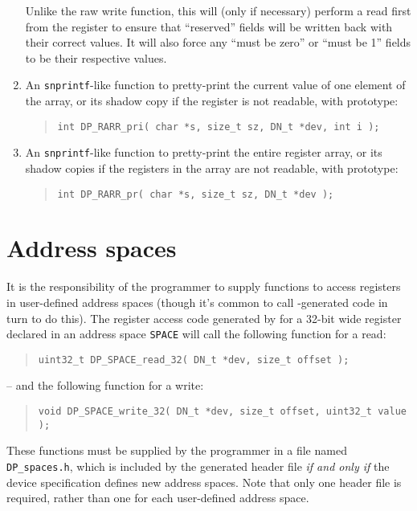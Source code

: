 \documentclass[a4paper,11pt,twoside]{report}
\begin{document}
\begin{enumerate}
  Unlike the raw write function, this will (only if necessary) perform
  a read first from the register to ensure that ``reserved'' fields
  will be written back with their correct values.  It will also force
  any ``must be zero'' or ``must be 1'' fields to be their respective 
  values.  
  
\item An \texttt{snprintf}-like function to pretty-print the
  current value of one element of the array, or its shadow copy if the
  register is not readable, with prototype:
  \begin{quote}
    \texttt{int DP\_RARR\_pri( char *s, size\_t sz, DN\_t *dev, int i );}
  \end{quote}
  
\item An \texttt{snprintf}-like function to pretty-print the
  entire register array, or its shadow copies if the registers in the
  array are not readable, with prototype:
  \begin{quote}
    \texttt{int DP\_RARR\_pr( char *s, size\_t sz, DN\_t *dev );}
  \end{quote}

\end{enumerate}

\section{Address spaces}\label{sec:old:c-spaces}

It is the responsibility of the programmer to supply functions to
access registers in user-defined address spaces (though it's common to
call \Mac{}-generated code in turn to do this).   The register access
code generated by \Mac for a 32-bit wide register declared in an
address space \texttt{SPACE} will call the following function for a
read:
  \begin{quote}
    \texttt{uint32\_t DP\_SPACE\_read\_32( DN\_t *dev, size\_t offset );}
  \end{quote}
-- and the following function for a write:
  \begin{quote}
    \texttt{void DP\_SPACE\_write\_32( DN\_t *dev, size\_t offset,
      uint32\_t value );}
  \end{quote}

These functions must be supplied by the programmer in a file named
\texttt{DP\_spaces.h}, which is included by the generated header file
\emph{if and only if} the device specification defines new address
spaces.  Note that only one header file is required, rather than one
for each user-defined address space.
\end{document}
